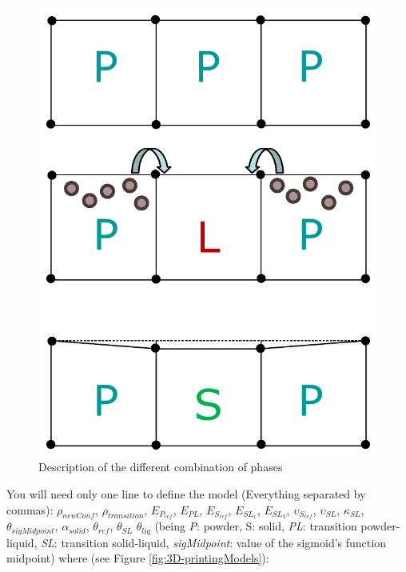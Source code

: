 \documentclass[oneside,11pt,times]{book}
\begin{document}
\begin{enumerate}
\begin{figure}[h!]
    \centering
    \includegraphics[scale=0.5]{imgs/UserManual/Theory2.pdf}
    \caption{Description of the different combination of phases}
    \label{3DprintingTheory}
\end{figure}


You will need only one line to define the model (Everything separated by commas): $\rho_{newConf}$, $\rho_{transition}$, $E_{P_{ref}}$,
$E_{PL}$, $E_{S_{ref}}$, $E_{{SL}_1}$, $E_{{SL}_2}$, $\upsilon_{S_{ref}}$, $\upsilon_{SL}$, $\kappa_{SL}$, $\theta_{sigMidpoint}$, $\alpha_{solid}$, $\theta_{ref}$, $\theta_{SL}$ $\theta_{liq}$ (being \textit{P}: powder, S: solid, \textit{PL}: transition powder-liquid, \textit{SL}: transition solid-liquid, \textit{sigMidpoint}: value of the sigmoid's function midpoint) where (see Figure \ref{fig:3D-printingModels}):  \\


\end{enumerate}
\end{document}
